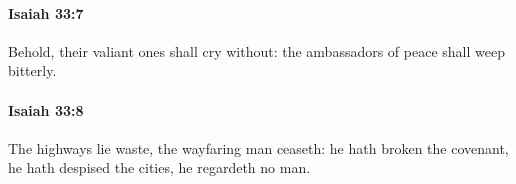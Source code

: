 		\paragraph{Isaiah 33:7} %
			\label{ISAIAH-33-7}

			Behold, their valiant ones shall cry without: the ambassadors of peace shall weep bitterly.


		\paragraph{Isaiah 33:8} %
			\label{ISAIAH-33-8}

			The highways lie waste, the wayfaring man ceaseth: he hath broken the covenant, he hath despised the cities, he regardeth no man.


